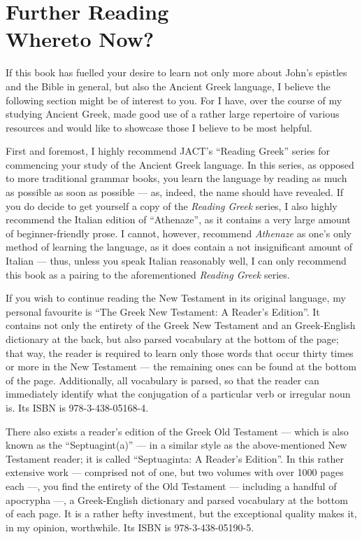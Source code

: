 \chapter*{Further Reading \\ \large Whereto Now?}
  
If this book has fuelled your desire to learn not only more about John's epistles and the Bible in general, but also the Ancient Greek language, I believe the following section might be of interest to you. For I have, over the course of my studying Ancient Greek, made good use of a rather large repertoire of various resources and would like to showcase those I believe to be most helpful. 

First and foremost, I highly recommend JACT's ``Reading Greek'' series for commencing your study of the Ancient Greek language. In this series, as opposed to more traditional grammar books, you learn the language by reading as much as possible as soon as possible — as, indeed, the name should have revealed. If you do decide to get yourself a copy of the \textit{Reading Greek} series, I also highly recommend the Italian edition of ``Athenaze'', as it contains a very large amount of beginner-friendly prose. I cannot, however, recommend \textit{Athenaze} as one's only method of learning the language, as it does contain a not insignificant amount of Italian — thus, unless you speak Italian reasonably well, I can only recommend this book as a pairing to the aforementioned \textit{Reading Greek} series.

If you wish to continue reading the New Testament in its original language, my personal favourite is “The Greek New Testament: A Reader's Edition”. It contains not only the entirety of the Greek New Testament and an Greek-English dictionary at the back, but also parsed vocabulary at the bottom of the page; that way, the reader is required to learn only those words that occur thirty times or more in the New Testament — the remaining ones can be found at the bottom of the page. Additionally, all vocabulary is parsed, so that the reader can immediately identify what the conjugation of a particular verb or irregular noun is. Its ISBN is 978-3-438-05168-4.

There also exists a reader’s edition of the Greek Old Testament — which is also known as the “Septuagint(a)” — in a similar style as the above-mentioned New Testament reader; it is called “Septuaginta: A Reader's Edition”. In this rather extensive work — comprised not of one, but two volumes with over 1000 pages each —, you find the entirety of the Old Testament — including a handful of apocrypha —, a Greek-English dictionary and parsed vocabulary at the bottom of each page. It is a rather hefty investment, but the exceptional quality makes it, in my opinion, worthwhile. Its ISBN is 978-3-438-05190-5.

